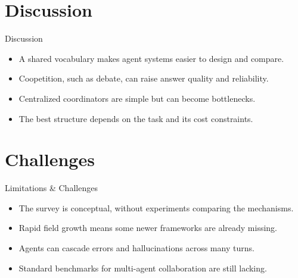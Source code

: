 \documentclass[10pt]{beamer}
\begin{document}
\section{Discussion}
\begin{frame}{Discussion}
\begin{itemize}
  \item A shared vocabulary makes agent systems easier to design and compare.
  \item Coopetition, such as debate, can raise answer quality and reliability.
  \item Centralized coordinators are simple but can become bottlenecks.
  \item The best structure depends on the task and its cost constraints.
\end{itemize}
\end{frame}
\section{Challenges}
\begin{frame}{Limitations \& Challenges}
\begin{itemize}
  \item The survey is conceptual, without experiments comparing the mechanisms.
  \item Rapid field growth means some newer frameworks are already missing.
  \item Agents can cascade errors and hallucinations across many turns.
  \item Standard benchmarks for multi-agent collaboration are still lacking.
\end{itemize}
\end{frame}
\end{document}

